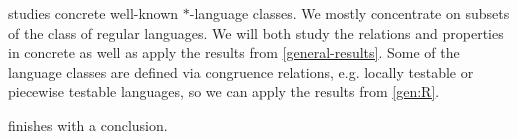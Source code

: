  studies concrete well-known $*$-language classes. We mostly concentrate on subsets of the class of regular languages. We will both study the relations and properties in concrete as well as apply the results from \cref{general-results}. Some of the language classes are defined via congruence relations, e.g. locally testable or piecewise testable languages, so we can apply the results from \cref{gen:R}.

 finishes with a conclusion.
